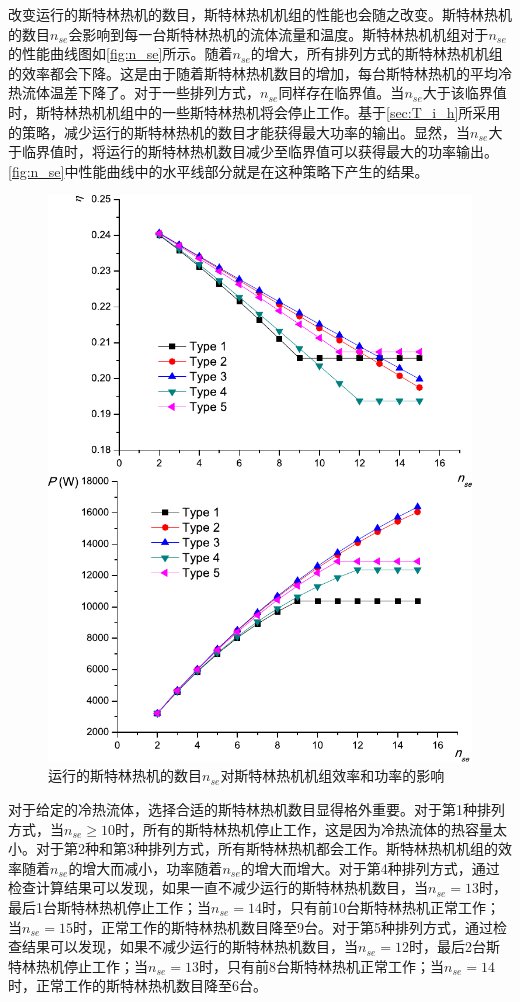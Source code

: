 改变运行的斯特林热机的数目，斯特林热机机组的性能也会随之改变。斯特林热机的数目$n_{se}$会影响到每一台斯特林热机的流体流量和温度。斯特林热机机组对于$n_{se}$的性能曲线图如\autoref{fig:n_se}所示。随着$n_{se}$的增大，所有排列方式的斯特林热机机组的效率都会下降。这是由于随着斯特林热机数目的增加，每台斯特林热机的平均冷热流体温差下降了。对于一些排列方式，$n_{se}$同样存在临界值。当$n_{se}$大于该临界值时，斯特林热机机组中的一些斯特林热机将会停止工作。基于\autoref{sec:T_i_h}所采用的策略，减少运行的斯特林热机的数目才能获得最大功率的输出。显然，当$n_{se}$大于临界值时，将运行的斯特林热机数目减少至临界值可以获得最大的功率输出。\autoref{fig:n_se}中性能曲线中的水平线部分就是在这种策略下产生的结果。

\begin{figure}[htbp]
	\centering
	\includegraphics[width = 0.95\columnwidth]{fig/n_se}
	\caption{运行的斯特林热机的数目$n_{se}$对斯特林热机机组效率和功率的影响}
	\label{fig:n_se}
\end{figure}

对于给定的冷热流体，选择合适的斯特林热机数目显得格外重要。对于第1种排列方式，当$n_{se} \geqslant 10$时，所有的斯特林热机停止工作，这是因为冷热流体的热容量太小。对于第2种和第3种排列方式，所有斯特林热机都会工作。斯特林热机机组的效率随着$n_{se}$的增大而减小，功率随着$n_{se}$的增大而增大。对于第4种排列方式，通过检查计算结果可以发现，如果一直不减少运行的斯特林热机数目，当$n_{se} = 13$时，最后1台斯特林热机停止工作；当$n_{se} = 14$时，只有前10台斯特林热机正常工作；当$n_{se} = 15$时，正常工作的斯特林热机数目降至9台。对于第5种排列方式，通过检查结果可以发现，如果不减少运行的斯特林热机数目，当$n_{se} = 12$时，最后2台斯特林热机停止工作；当$n_{se} = 13$时，只有前8台斯特林热机正常工作；当$n_{se} = 14$时，正常工作的斯特林热机数目降至6台。

